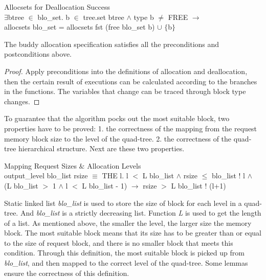 \documentclass[runningheads]{llncs}
\begin{document}
\begin{definition} {Allocsets for Deallocation Success} \\
$\exists$btree $\in$ blo\_set. b $\in$ tree.set btree $\wedge$ type b $\neq$ FREE $\longrightarrow$ \\
\phantom{x} \hspace{10pt} allocsets blo\_set = allocsets fst (free blo\_set b) $\cup$ $\lbrace$b$\rbrace$
\end{definition}

\begin{theorem}
The buddy allocation specification satisfies all the preconditions and postconditions above.
\end{theorem}

\begin{proof}
Apply preconditions into the definitions of allocation and deallocation, then the certain result of executions can be calculated according to the branches in the functions. The variables that change can be traced through block type changes.
\end{proof}

To guarantee that the algorithm pocks out the most suitable block, two properties have to be proved: 1. the correctness of the mapping from the request memory block size to the level of the quad-tree. 2. the correctness of the quad-tree hierarchical  structure. Next are these two properties.

\begin{definition} {Mapping Request Sizes $\&$ Allocation Levels} \\
output\_level blo\_list rsize $\equiv$ THE l. l $<$ L blo\_list $\wedge$ rsize $\le$ blo\_list ! l $\wedge$ \\
\phantom{x} \hspace{10pt} (L blo\_list $>$ 1 $\wedge$ l $<$ L blo\_list - 1) $\longrightarrow$ rsize $>$ L blo\_list ! (l+1)
\end{definition}

Static linked list \textsl{blo\_list} is used to store the size of block for each level in a quad-tree. And \textsl{blo\_list} is a strictly decreasing list. Function \textsl{L} is used to get the length of a list. As mentioned above, the smaller the level, the larger size the memory block. The most suitable block means that its size has to be greater than or equal to the size of request block, and there is no smaller block that meets this condition. Through this definition, the most suitable block is picked up from \textsl{blo\_list}, and then mapped to the correct level of the quad-tree. Some lemmas ensure the correctness of this definition.
\end{document}
